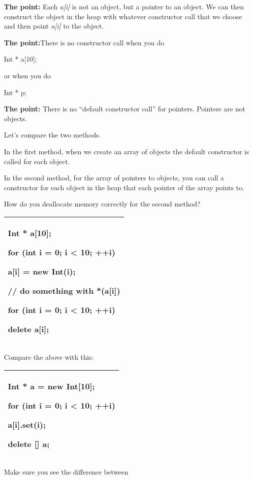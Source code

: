 \documentclass[
]{article}
\begin{document}
\textbf{The point:} Each \emph{a{[}i{]}} is not an object, but a pointer
to an object. We can then construct the object in the heap with whatever
constructor call that we choose and then point \emph{a{[}i{]}} to the
object.

\textbf{The point:}There is no constructor call when you do

Int * a{[}10{]};

or when you do

Int * p;

\textbf{The point:} There is no ``default constructor call'' for
pointers. Pointers are not objects.

Let's compare the two methods.

In the first method, when we create an array of objects the default
constructor is called for each object.

In the second method, for the array of pointers to objects, you can call
a constructor for each object in the heap that each pointer of the array
points to.

How do you deallocate memory correctly for the second method?

\begin{longtable}[]{@{}l@{}}
\toprule
\endhead
\begin{minipage}[t]{0.97\columnwidth}\raggedright
Int * a{[}10{]};

for (int i = 0; i \textless{} 10; ++i)

a{[}i{]} = new Int(i);

// do something with *(a{[}i{]})

for (int i = 0; i \textless{} 10; ++i)

delete a{[}i{]};\strut
\end{minipage}\tabularnewline
\bottomrule
\end{longtable}

Compare the above with this:

\begin{longtable}[]{@{}l@{}}
\toprule
\endhead
\begin{minipage}[t]{0.97\columnwidth}\raggedright
Int * a = new Int{[}10{]};

for (int i = 0; i \textless{} 10; ++i)

a{[}i{]}.set(i);

delete {[}{]} a;\strut
\end{minipage}\tabularnewline
\bottomrule
\end{longtable}

Make sure you see the difference between
\end{document}
